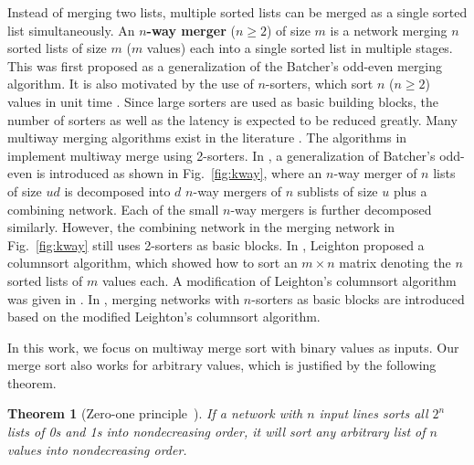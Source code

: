 \documentclass[10pt,journal,cspaper,compsoc]{IEEEtran}
\newtheorem{thm}{Theorem}[section]
\begin{document}
Instead of merging two lists, multiple sorted lists can be merged as a single sorted list simultaneously.
An \textbf{$n$-way merger} ($n\ge 2$) of size $m$ is a network merging $n$ sorted lists of size $m$ ($m$ values) each into a single sorted list in multiple stages.
This was first proposed as a generalization of the Batcher's odd-even merging algorithm. It is also motivated by the use of $n$-sorters, which sort $n$ ($n\ge 2$) values in unit time \cite{parker1989constructing,beigel1990sorting}. Since large sorters are used as basic building blocks, the number of sorters as well as the latency is expected to be reduced greatly.
Many multiway merging algorithms exist in the literature \cite{drysdale1975improved, van1974economical, Lee95multiway, nakatani1989e1, lee1994sorting, leighton1984tight, parker1989constructing, liszka1993generalized, gao1997sloping, zhao1998efficient}. The algorithms in \cite{drysdale1975improved, van1974economical} implement multiway merge using 2-sorters. In \cite{Lee95multiway}, a generalization of Batcher's odd-even is introduced as shown in Fig.~\ref{fig:kway}, where an $n$-way merger of $n$ lists of size $ud$ is decomposed into $d$ $n$-way mergers of $n$ sublists of size $u$ plus a combining network. Each of the small $n$-way mergers is further decomposed similarly. However, the combining network in the merging network in Fig.~\ref{fig:kway} still uses 2-sorters as basic blocks.
In \cite{leighton1984tight}, Leighton proposed a columnsort algorithm, which showed how to sort an $m \times n$ matrix denoting the $n$ sorted lists of $m$ values each. A modification of Leighton's columnsort algorithm was given in \cite{parker1989constructing}.
In \cite{gao1997sloping,zhao1998efficient}, merging networks with $n$-sorters as basic blocks are introduced based on the modified Leighton's columnsort algorithm.

In this work, we focus on multiway merge sort with binary values as inputs. Our merge sort also works for arbitrary values, which is justified by the following theorem.
\begin{thm}[Zero-one principle~\cite{Bat68sorting}]
  If a network with $n$ input lines sorts all $2^n$ lists of 0s and 1s into nondecreasing order, it will sort any arbitrary list of $n$ values into nondecreasing order.
\end{thm}
\end{document}
